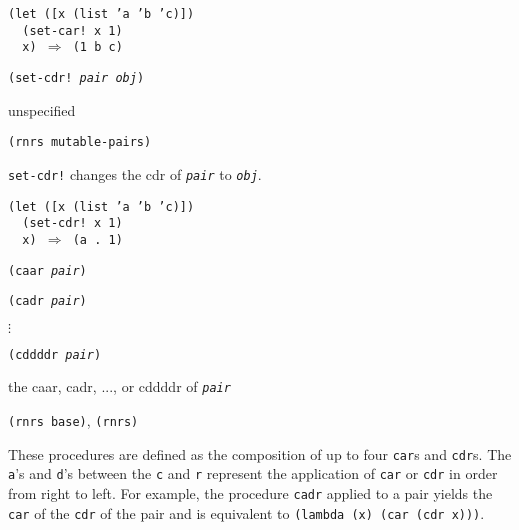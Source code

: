 \begin{alltt}
(let ([x (list 'a 'b 'c)])
  (set-car! x 1)
  x) \(\Rightarrow\) (1 b c)
\end{alltt}

\begin{description}

\label{objects_s41}\item[procedure] \texttt{(set-cdr! \textit{pair} \textit{obj})}



\item[returns] unspecified


\item[libraries] \texttt{(rnrs mutable-pairs)}
\end{description}

\texttt{set-cdr!} changes the cdr of \texttt{\textit{pair}} to \texttt{\textit{obj}}.

\begin{alltt}
(let ([x (list 'a 'b 'c)])
  (set-cdr! x 1)
  x) \(\Rightarrow\) (a . 1)
\end{alltt}

\begin{description}

\label{objects_s42}\item[procedure] \texttt{(caar \textit{pair})}



\item[procedure] \texttt{(cadr \textit{pair})}

\(\vdots\) 

\item[procedure] \texttt{(cddddr \textit{pair})}



\item[returns] the caar, cadr, ..., or cddddr of \texttt{\textit{pair}}


\item[libraries] \texttt{(rnrs base)}, \texttt{(rnrs)}
\end{description}


These procedures are defined as the composition of up to four \texttt{car}s
and \texttt{cdr}s.
The \texttt{a}'s and \texttt{d}'s between the \texttt{c} and \texttt{r} represent the
application of \texttt{car} or \texttt{cdr} in order from right to left.
For example, the procedure \texttt{cadr} applied to a pair yields the \texttt{car}
of the \texttt{cdr} of the pair and is equivalent to
\texttt{(lambda (x) (car (cdr x)))}.


